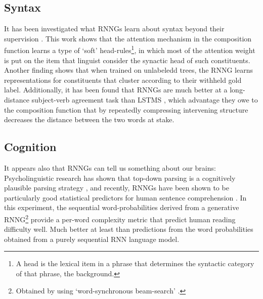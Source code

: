 \subsection{Syntax} It has been investigated what RNNGs learn about syntax beyond their supervision \citep{kuncoro2017syntax}. This work shows that the attention mechanism in the composition function learns a type of `soft' head-rules\footnote{A head is the lexical item in a phrase that determines the syntactic category of that phrase, \cf the background.}, in which most of the attention weight is put on the item that linguist consider the synactic head of such constituents. Another finding shows that when trained on unlabeledd trees, the RNNG learns representations for constituents that cluster according to their withheld gold label. Additionally, it has been found that RNNGs are much better at a long-distance subject-verb agreement task than LSTMS \citep{linzen2016syntax,kuncoro2018learn}, which advantage they owe to the composition function that by repeatedly compressing intervening structure decreases the distance between the two words at stake.

\subsection{Cognition} It appears also that RNNGs can tell us something about our brains: Psycholinguistic research has shown that top-down parsing is a cognitively plausible parsing strategy \citep{brennan2016abstract}, and recently, RNNGs have been shown to be particularly good statistical predictors for human sentence comprehension \citep{hale2018beam}. In this experiment, the sequential word-probabilities derived from a generative RNNG\footnote{Obtained by using `word-synchronous beam-search' \citep{stern2017beam}.} provide a per-word complexity metric that predict human reading difficulty well. Much better at least than predictions from the word probabilities obtained from a purely sequential RNN language model.
